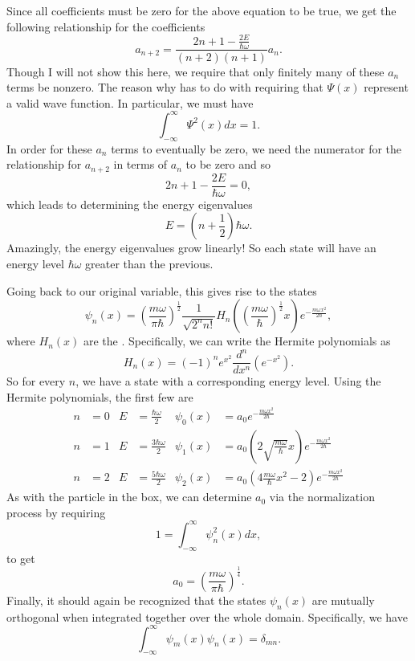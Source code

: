 Since all coefficients must be zero for the above equation to be true, we get the following relationship for the coefficients
\[
a_{n+2} = \frac{2n+1-\frac{2E}{\hbar \omega}}{(n+2)(n+1)}a_n.
\]
Though I will not show this here, we require that only finitely many of these $a_n$ terms be nonzero.  The reason why has to do with requiring that $\Psi(x)$ represent a valid wave function. In particular, we must have
\[
\int_{-\infty}^\infty \Psi^2(x) dx = 1.
\]
In order for these $a_n$ terms to eventually be zero, we need the numerator for the relationship for $a_{n+2}$ in terms of $a_n$ to be zero and so
\[
2n+1-\frac{2E}{\hbar \omega} =0,
\]
which leads to determining the energy eigenvalues
\[
\boxed{E=\left(n+\frac{1}{2}\right) \hbar \omega.}
\]
Amazingly, the energy eigenvalues grow linearly! So each state will have an energy level $\hbar \omega$ greater than the previous.

Going back to our original variable, this gives rise to the states
\[
\psi_n(x) = \left(\frac{m \omega}{\pi \hbar}\right)^{\frac{1}{2}} \frac{1}{\sqrt{2^n n!}} H_n\left(\left(\frac{m\omega}{\hbar}\right)^{\frac{1}{2}} x\right) e^{-\frac{m\omega x^2}{2\hbar}},
\]
where $H_n(x)$ are the  .  Specifically, we can write the Hermite polynomials as
\[
H_n(x) = (-1)^n e^{x^2} \frac{d^n}{dx^n} \left(e^{-x^2}\right).
\]
So for every $n$, we have a state with a corresponding energy level. Using the Hermite polynomials, the first few are
\begin{align*}
    n&=0 & E&=\frac{\hbar \omega}{2} & \psi_0(x)&=a_0 e^{-\frac{m\omega x^2}{2\hbar}}\\
    n&=1 & E&=\frac{3\hbar \omega}{2} & \psi_1(x)&=a_0 \left(2\sqrt{\frac{m \omega}{\hbar}}x\right)e^{-\frac{m\omega x^2}{2\hbar}}\\
    n&=2 & E&=\frac{5\hbar \omega}{2} & \psi_2(x)&=a_0 \left(4\frac{m \omega}{\hbar}x^2-2\right)e^{-\frac{m\omega x^2}{2\hbar}}
\end{align*}
As with the particle in the box, we can determine $a_0$ via the normalization process by requiring
\[
1=\int_{-\infty}^\infty \psi_n^2(x)dx,
\]
to get
\[
a_0 = \left(\frac{m\omega}{\pi \hbar}\right)^{\frac{1}{4}}.
\]
Finally, it should again be recognized that the states $\psi_n(x)$ are mutually orthogonal when integrated together over the whole domain. Specifically, we have
\[
\int_{-\infty}^\infty \psi_m(x)\psi_n(x) = \delta_{mn}.
\]

